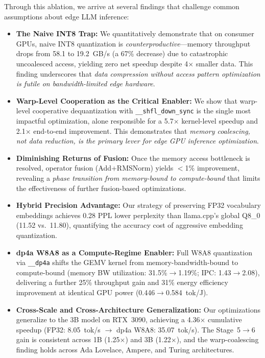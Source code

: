 \documentclass[conference]{IEEEtran}
\begin{document}
Through this ablation, we arrive at several findings that challenge common assumptions about edge LLM inference:

\begin{itemize}
    \item \textbf{The Naive INT8 Trap:} We quantitatively demonstrate that on consumer GPUs, naive INT8 quantization is \emph{counterproductive}---memory throughput drops from 58.1 to 19.2~GB/s (a 67\% decrease) due to catastrophic uncoalesced access, yielding zero net speedup despite 4$\times$ smaller data. This finding underscores that \emph{data compression without access pattern optimization is futile on bandwidth-limited edge hardware}.
    \item \textbf{Warp-Level Cooperation as the Critical Enabler:} We show that warp-level cooperative dequantization with \texttt{\_\_shfl\_down\_sync} is the single most impactful optimization, alone responsible for a 5.7$\times$ kernel-level speedup and 2.1$\times$ end-to-end improvement. This demonstrates that \emph{memory coalescing, not data reduction, is the primary lever for edge GPU inference optimization}.
    \item \textbf{Diminishing Returns of Fusion:} Once the memory access bottleneck is resolved, operator fusion (Add+RMSNorm) yields $<$1\% improvement, revealing a \emph{phase transition from memory-bound to compute-bound} that limits the effectiveness of further fusion-based optimizations.
    \item \textbf{Hybrid Precision Advantage:} Our strategy of preserving FP32 vocabulary embeddings achieves 0.28 PPL lower perplexity than llama.cpp's global Q8\_0 (11.52 vs.\ 11.80), quantifying the accuracy cost of aggressive embedding quantization.
    \item \textbf{dp4a W8A8 as a Compute-Regime Enabler:} Full W8A8 quantization via \texttt{\_\_dp4a} shifts the GEMV kernel from memory-bandwidth-bound to compute-bound (memory BW utilization: 31.5\%$\to$1.19\%; IPC: 1.43$\to$2.08), delivering a further 25\% throughput gain and 31\% energy efficiency improvement at identical GPU power (0.446$\to$0.584~tok/J).
    \item \textbf{Cross-Scale and Cross-Architecture Generalization:} Our optimizations generalize to the 3B model on RTX~3090, achieving a 4.36$\times$ cumulative speedup (FP32: 8.05~tok/s $\to$ dp4a W8A8: 35.07~tok/s). The Stage~5$\to$6 gain is consistent across 1B (1.25$\times$) and 3B (1.22$\times$), and the warp-coalescing finding holds across Ada Lovelace, Ampere, and Turing architectures.
\end{itemize}
\end{document}
